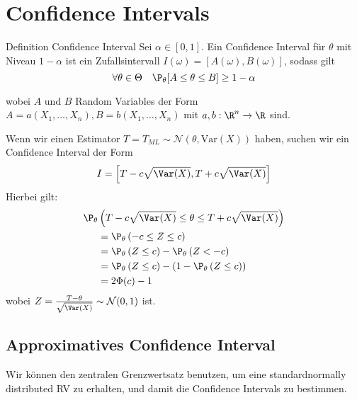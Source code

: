 \section{Confidence Intervals}
\begin{mainbox}{Definition Confidence Interval}
	Sei \(\alpha \in [0,1]\). Ein Confidence Interval für \(\theta\) mit Niveau \(1 - \alpha\) ist ein Zufallsintervall \(I(\omega)=[A(\omega),B(\omega)]\), sodass gilt
	\[\forall \theta \in \Theta \quad \P_\theta[A\le \theta \le B] \ge 1- \alpha\]

	wobei \(A\) und \(B\) Random Variables der Form \(A = a(X_1, \ldots, X_n), B = b(X_1, \ldots, X_n)\) mit \(a,b: \R^n \to \R\) sind.
\end{mainbox}

Wenn wir einen Estimator \(T = T_{ML} \sim \mathcal{N}\left(\theta, \text{Var}(X)\right)\) haben, suchen wir ein Confidence Interval der Form
\[I = \left[T-c \sqrt{\Var(X)}, T+c\sqrt{\Var(X)}\right]\]
Hierbei gilt:
\begin{align*}
	\P_\theta&\left(T-c\sqrt{\Var(X)} \le \theta \le T+c\sqrt{\Var(X)}\right) \\
	&= \P_\theta\left(-c\le Z \le c\right)\\
	&= \P_{\theta}\left(Z \leq c\right) - \P_{\theta}\left(Z < -c\right)\\
	&= \P_{\theta}\left(Z \leq c\right) - \left(1-\P_{\theta}\left(Z \leq c\right)\right)\\
	&= 2\Phi(c)-1
\end{align*}
wobei \(Z = \frac{T-\theta}{\sqrt{\Var(X)}} \sim \mathcal{N}(0,1)\) ist.


\subsection{Approximatives Confidence Interval}
Wir können den zentralen Grenzwertsatz benutzen, um eine standardnormally distributed RV zu erhalten, und damit die Confidence Intervals zu bestimmen.

